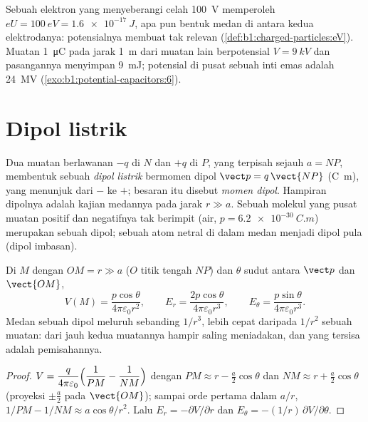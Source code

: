 \begin{example}\label{ex:b1:potential-capacitors:eV}
Sebuah elektron yang menyeberangi celah \qty{100}{V} memperoleh $eU = \qty{100}{eV} =
\qty{1.6e-17}{J}$, apa pun bentuk medan di antara kedua
elektrodanya: potensialnya membuat  tak relevan
(\cref{def:b1:charged-particles:eV}). Muatan \qty{1}{\micro C} pada jarak
\qty{1}{m} dari muatan lain berpotensial $V = \qty{9}{kV}$ dan pasangannya menyimpan
\qty{9}{mJ}; potensial di pusat sebuah inti emas adalah
\qty{24}{MV} (\cref{exo:b1:potential-capacitors:6}).
\end{example}

\section{Dipol listrik}

\begin{definition}\label{def:b1:potential-capacitors:dipole}
Dua muatan berlawanan $-q$ di $N$ dan $+q$ di $P$, yang terpisah sejauh $a = NP$,
membentuk sebuah \emph{dipol listrik} bermomen dipol
$\vect p = q\,\vect{NP}$ (\unit{C.m}), yang menunjuk dari $-$ ke $+$; besaran itu
disebut \emph{momen dipol}. Hampiran dipolnya adalah kajian medannya pada jarak
$r \gg a$. Sebuah molekul yang pusat muatan positif dan negatifnya tak berimpit
(air, $p = \qty{6.2e-30}{C.m}$) merupakan sebuah dipol; sebuah atom netral di
dalam medan menjadi dipol pula (dipol imbasan).
\end{definition}

\begin{proposition}\label{prop:b1:potential-capacitors:dipolefield}
Di $M$ dengan $OM = r \gg a$ ($O$ titik tengah $NP$) dan $\theta$ sudut
antara $\vect p$ dan $\vect{OM}$,
\[
V(M) = \frac{p\cos\theta}{4\pi\varepsilon_0 r^2}, \qquad
E_r = \frac{2p\cos\theta}{4\pi\varepsilon_0r^3}, \qquad
E_\theta = \frac{p\sin\theta}{4\pi\varepsilon_0r^3} .
\]
Medan sebuah dipol meluruh sebanding $1/r^3$, lebih cepat daripada $1/r^2$
sebuah muatan: dari jauh kedua muatannya hampir saling meniadakan, dan yang
tersisa adalah pemisahannya.
\end{proposition}

\begin{proof}
$V = \dfrac{q}{4\pi\varepsilon_0}\Bigl(\dfrac1{PM} - \dfrac1{NM}\Bigr)$ dengan
$PM \approx r - \tfrac a2\cos\theta$ dan $NM \approx r + \tfrac a2\cos\theta$
(proyeksi $\pm\tfrac a2$ pada $\vect{OM}$); sampai orde pertama dalam $a/r$,
$1/PM - 1/NM \approx a\cos\theta/r^2$. Lalu $E_r = -\partial V/\partial r$ dan
$E_\theta = -(1/r)\,\partial V/\partial\theta$.
\end{proof}

